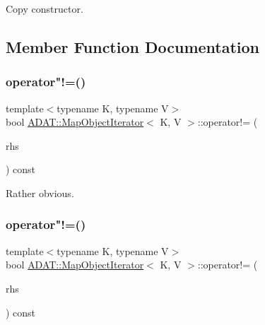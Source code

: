 Copy constructor. 



\subsection{Member Function Documentation}
\mbox{\label{classADAT_1_1MapObjectIterator_a1110663c46b0e652d8ecd0dbe80bd255}} 
\subsubsection{\texorpdfstring{operator"!=()}{operator!=()}\hspace{0.1cm}{\footnotesize\ttfamily [1/3]}}
{\footnotesize\ttfamily template$<$typename K, typename V$>$ \\
bool \mbox{\hyperlink{classADAT_1_1MapObjectIterator}{A\+D\+A\+T\+::\+Map\+Object\+Iterator}}$<$ K, V $>$\+::operator!= (\begin{DoxyParamCaption}\item[{const \mbox{\hyperlink{classADAT_1_1MapObjectIterator}{Map\+Object\+Iterator}}$<$ K, V $>$ \&}]{rhs }\end{DoxyParamCaption}) const\hspace{0.3cm}{\ttfamily [inline]}}



Rather obvious. 

\mbox{\label{classADAT_1_1MapObjectIterator_a1110663c46b0e652d8ecd0dbe80bd255}} 
\subsubsection{\texorpdfstring{operator"!=()}{operator!=()}\hspace{0.1cm}{\footnotesize\ttfamily [2/3]}}
{\footnotesize\ttfamily template$<$typename K, typename V$>$ \\
bool \mbox{\hyperlink{classADAT_1_1MapObjectIterator}{A\+D\+A\+T\+::\+Map\+Object\+Iterator}}$<$ K, V $>$\+::operator!= (\begin{DoxyParamCaption}\item[{const \mbox{\hyperlink{classADAT_1_1MapObjectIterator}{Map\+Object\+Iterator}}$<$ K, V $>$ \&}]{rhs }\end{DoxyParamCaption}) const\hspace{0.3cm}{\ttfamily [inline]}}



